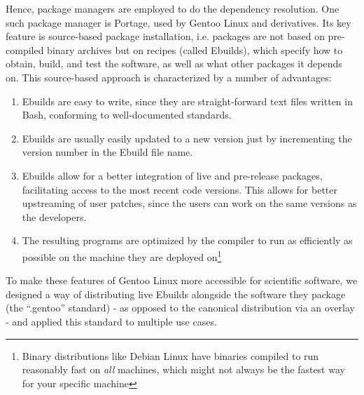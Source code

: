 \documentclass[11pt]{scrartcl}
\begin{document}
		Hence, package managers are employed to do the dependency resolution.
		One such package manager is Portage, used by Gentoo Linux and derivatives.
		Its key feature is source-based package installation, i.e. packages are not based on pre-compiled binary archives but on recipes (called Ebuilds), which specify how to obtain, build, and test the software, as well as what other packages it depends on.
		This source-based approach is characterized by a number of advantages:
		\begin{enumerate}
			\item Ebuilds are easy to write, since they are straight-forward text files written in Bash, conforming to well-documented standards.
			\item Ebuilds are usually easily updated to a new version just by incrementing the version number in the Ebuild file name.
			\item Ebuilds allow for a better integration of live and pre-release packages, facilitating access to the most recent code versions.
			This allows for better upstreaming of user patches, since the users can work on the same versions as the developers.
			\item The resulting programs are optimized by the compiler to run as efficiently as possible on the machine they are deployed on\footnote{Binary distributions like Debian Linux have binaries compiled to run reasonably fast on \emph{all} machines, which might not always be the fastest way for your specific machine}
		\end{enumerate}
		
		To make these features of Gentoo Linux more accessible for scientific software, we designed a way of distributing live Ebuilds alongside the software they package (the “.gentoo” standard) - as opposed to the canonical distribution via an overlay - and applied this standard to multiple use cases.
	
	
	
	
	\appendix
	
\end{document}
